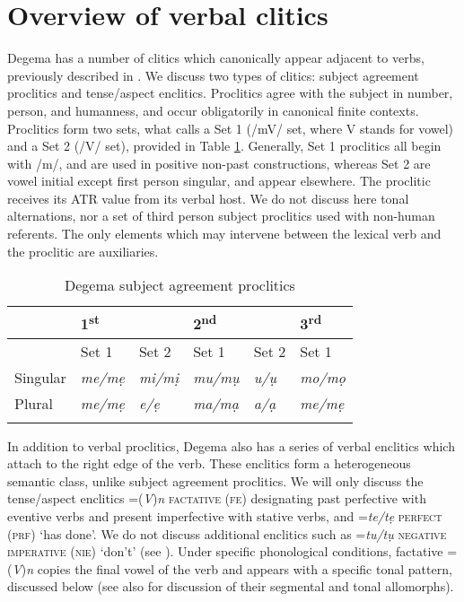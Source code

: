 \documentclass[output=paper]{langsci/langscibook}
\begin{document}
\section{Overview of verbal clitics}\label{sec:rolle:3}

Degema has a number of clitics which canonically appear adjacent to verbs, previously described in \citet{Kari2002a,Kari2002b,Kari2002c,Kari2002d,Kari2003b,Kari2004,Kari2005}. We discuss two types of clitics: subject agreement proclitics and tense/aspect enclitics. Proclitics agree with the subject in number, person, and humanness, and occur obligatorily in canonical finite contexts. Proclitics form two sets, what \citet[333-335]{Kari2004} calls a Set 1 (/mV/ set, where V stands for vowel) and a Set 2 (/V/ set), provided in Table \ref{bkm:Ref447870844}. Generally, Set 1 proclitics all begin with /m/, and are used in positive non-past constructions, whereas Set 2 are vowel initial except first person singular, and appear elsewhere. The proclitic receives its ATR value from its verbal host. We do not discuss here tonal alternations, nor a set of third person subject proclitics used with non-human referents. The only elements which may intervene between the lexical verb and the proclitic are auxiliaries.

\begin{table}

\begin{tabularx}{\textwidth}{XXXXXX}
\lsptoprule
    & \multicolumn{2}{X}{ 1\textsuperscript{st}} &\multicolumn{2}{X}{ 2\textsuperscript{nd}} & 3\textsuperscript{rd}\\
    \midrule
    & {Set 1} & {Set 2} & {Set 1} & {Set 2} & {Set 1}\\
{Singular} & {\itshape me/mẹ} & {\itshape mi/mị} & {\itshape mu/mụ} & {\itshape u/ụ} & {\itshape mo/mọ}\\
{Plural} & {\itshape me/mẹ} & {\itshape e/ẹ} & {\itshape ma/mạ} & {\itshape a/ạ} & {\itshape me/mẹ}\\
\lspbottomrule
\end{tabularx}
\caption{Degema subject agreement proclitics}
\label{bkm:Ref447870844}
\end{table}


In addition to verbal proclitics, Degema also has a series of verbal enclitics which attach to the right edge of the verb. These enclitics form a heterogeneous semantic class, unlike subject agreement proclitics. We will only discuss the tense/aspect enclitics =(\textit{V})\textit{n} \textsc{factative (fe)} designating past perfective with eventive verbs and present imperfective with stative verbs, and =\textit{te/tẹ} \textsc{perfect} (\textsc{prf}) ‘has done’. We do not discuss additional enclitics such as =\textit{tu/tụ} \textsc{negative imperative (nie)} ‘don’t’ (see \citealt{Kari2004}). Under specific phonological conditions, factative =(\textit{V})\textit{n} copies the final vowel of the verb and appears with a specific tonal pattern, discussed below (see also \citealt[340-342]{Kari2004}  for discussion of their segmental and tonal allomorphs).   
\end{document}
